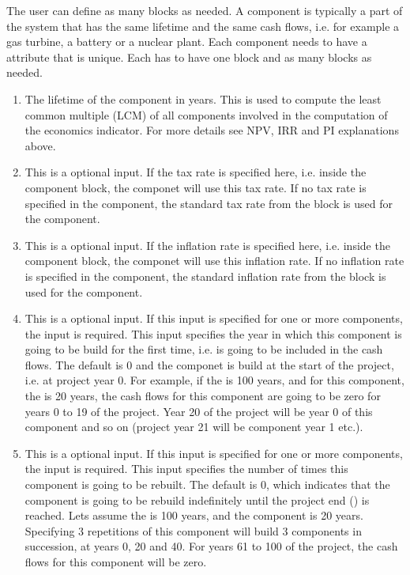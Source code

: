 The user can define as many  blocks as needed. A component is typically a part of the system that has the same lifetime and the same cash flows, 
i.e. for example a gas turbine, a battery or a nuclear plant. Each component needs to have a  attribute that is unique. Each  has to have
 one  block and as many  blocks as needed.

\begin{enumerate}
\item[\xmlNode{Life\_time}] The lifetime of the component in years. This is used to compute the least common multiple (LCM) of all components involved in the
 computation of the economics indicator. For more details see NPV, IRR and PI explanations above.

\item[\xmlNode{tax}] This is a optional input. If the tax rate is specified here, i.e. inside the component block, the componet will use this tax rate. If no tax rate is specified in the component, the standard tax rate from the  block is used for the component.
\item[\xmlNode{inflation}] This is a optional input. If the inflation rate is specified here, i.e. inside the component block, the componet will use this inflation rate. If no inflation rate is specified in the component, the standard inflation rate from the  block is used for the component.

\item[\xmlNode{StartTime}] This is a optional input. If this input is specified for one or more components, the  input  is required. This input specifies the year in which this component is going to be build for the first time, i.e. is going to be included in the cash flows. The default is 0 and the componet is build at the start of the project, i.e. at project year 0. For example, if the  is 100 years, and for this component, the  is 20 years, the cash flows for this component are going to be zero for years 0 to 19 of the project. Year 20 of the project will be year 0 of this component and so on (project year 21 will be component year 1 etc.).
\item[\xmlNode{Repetitions}] This is a optional input. If this input is specified for one or more components, the  input  is required. This input specifies the number of times this component is going to be rebuilt. The default is 0, which indicates that the component is going to be rebuild indefinitely until the project end () is reached. Lets assume the  is 100 years, and the component  is 20 years. Specifying 3 repetitions of this component will build 3 components in succession, at years 0, 20 and 40. For years 61 to 100 of the project, the cash flows for this component will be zero.


\end{enumerate}
